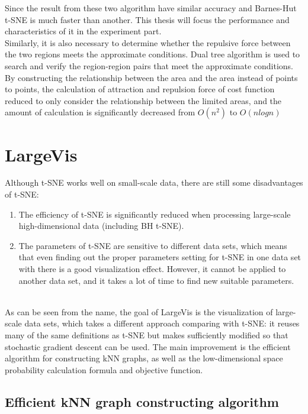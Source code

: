 \noindent Since the result from these two algorithm have similar accuracy and Barnes-Hut t-SNE is much faster than another. This thesis will focus the performance and characteristics of it in the experiment part.\\

\noindent Similarly, it is also necessary to determine whether the repulsive force between the two regions meets the approximate conditions. Dual tree algorithm is used to search and verify the region-region pairs that meet the approximate conditions\cite{ref9}. By constructing the relationship between the area and the area instead of points to points, the calculation of attraction and repulsion 
force of cost function reduced to only consider the relationship between the limited areas, and the amount of calculation is significantly decreased from $O(n^2)$ to $O(nlogn)$


\chapter{LargeVis}

\noindent  Although t-SNE works well on small-scale data, there are still some disadvantages of t-SNE:


\begin{enumerate}[1)]
\item The efficiency of t-SNE is significantly reduced when processing large-scale high-dimensional data (including BH t-SNE).
\item The parameters of t-SNE are sensitive to different data sets, which means that even finding out the proper parameters setting for t-SNE in one data set with there is a good visualization effect. However, it cannot be applied to another data set, and it takes a lot of time to find new suitable parameters.
\end{enumerate}\\

\noindent As can be seen from the name, the goal of LargeVis\cite{ref5} is the visualization of large-scale data sets, which takes a different approach comparing with t-SNE: it reuses many of the same definitions as t-SNE but makes sufficiently modified so that stochastic gradient descent can be used. The main improvement is the efficient algorithm for constructing kNN graphs, as well as the low-dimensional space probability calculation formula and objective function.

\section{Efficient kNN graph constructing algorithm}

